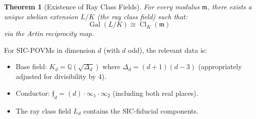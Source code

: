 \documentclass[a4paper,11pt]{article}
\newtheorem{theorem}{Theorem}[section]
\DeclareMathOperator{\Gal}{Gal}
\DeclareMathOperator{\Cl}{Cl}
\newcommand{\Q}{\mathbb{Q}}
\begin{document}
\begin{theorem}[Existence of Ray Class Fields]
For every modulus $\mathfrak{m}$, there exists a unique abelian extension $L/K$ (the ray class field) such that:
\begin{equation}
\Gal(L/K) \cong \Cl_K(\mathfrak{m})
\end{equation}
via the Artin reciprocity map.
\end{theorem}

For SIC-POVMs in dimension $d$ (with $d$ odd), the relevant data is:
\begin{itemize}
    \item Base field: $K_d = \Q(\sqrt{\Delta_d})$ where $\Delta_d = (d+1)(d-3)$ (appropriately adjusted for divisibility by 4).
    \item Conductor: $\mathfrak{f}_d = (d) \cdot \infty_1 \cdot \infty_2$ (including both real places).
    \item The ray class field $L_d$ contains the SIC-fiducial components.
\end{itemize}
\end{document}
